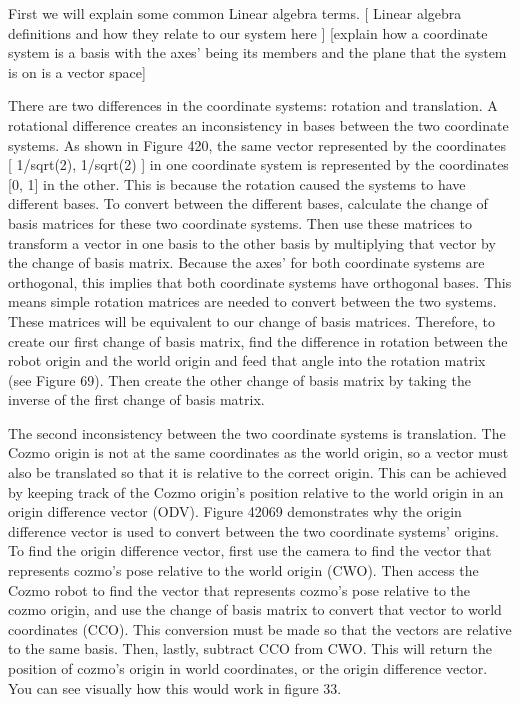 \documentclass[man]{apa6}
\begin{document}
First we will explain some common Linear algebra terms. 
[ Linear algebra definitions and how they relate to our system here ]
[explain how a coordinate system is a basis with the axes’ being its members and the plane that the system is on is a vector space]

There are two differences in the coordinate systems: rotation and translation. A rotational difference creates an inconsistency in bases between the two coordinate systems. As shown in Figure 420, the same vector represented by the coordinates [ 1/sqrt(2), 1/sqrt(2) ] in one coordinate system is represented by the coordinates [0, 1] in the other. This is because the rotation caused the systems to have different bases. To convert between the different bases, calculate the change of basis matrices for these two coordinate systems. Then use these matrices to transform a vector in one basis to the other basis by multiplying that vector by the change of basis matrix. Because the axes’ for both coordinate systems are orthogonal, this implies that both coordinate systems have orthogonal bases. This means simple rotation matrices are needed to convert between the two systems. These matrices will be equivalent to our change of basis matrices. Therefore, to create our first change of basis matrix, find the difference in rotation between the robot origin and the world origin and feed that angle into the rotation matrix (see Figure 69). Then create the other change of basis matrix by taking the inverse of the first change of basis matrix.

The second inconsistency between the two coordinate systems is translation. The Cozmo origin is not at the same coordinates as the world origin, so a vector must also be translated so that it is relative to the correct origin. This can be achieved by keeping track of the Cozmo origin’s position relative to the world origin in an origin difference vector (ODV). Figure 42069 demonstrates why the origin difference vector is used to convert between the two coordinate systems’ origins. To find the origin difference vector, first use the camera to find the vector that represents cozmo’s pose relative to the world origin (CWO). Then access the Cozmo robot to find the vector that represents cozmo’s pose relative to the cozmo origin, and use the change of basis matrix to convert that vector to world coordinates (CCO). This conversion must be made so that the vectors are relative to the same basis. Then, lastly, subtract CCO from CWO. This will return the position of cozmo’s origin in world coordinates, or the origin difference vector. You can see visually how this would work in figure 33.
\end{document}
